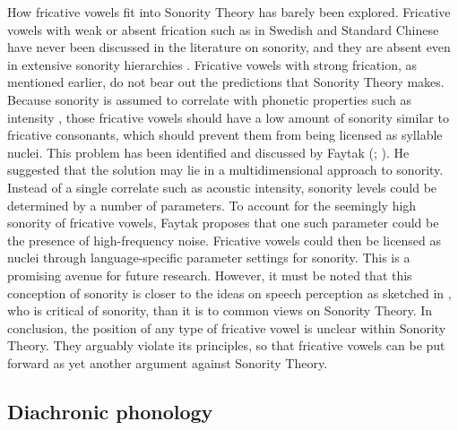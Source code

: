 \documentclass[output=paper,colorlinks,citecolor=brown,chinesefont]{langscibook}
\begin{document}
How fricative vowels fit into Sonority Theory has barely been explored. Fricative vowels with weak or absent frication such as in Swedish and Standard Chinese have never been discussed in the literature on sonority, and they are absent even in extensive sonority hierarchies \citep[60]{Parker_2008}. Fricative vowels with strong frication, as mentioned earlier, do not bear out the predictions that Sonority Theory makes. Because sonority is assumed to correlate with phonetic properties such as intensity \citep{Parker_2008}, those fricative vowels should have a low amount of sonority similar to fricative consonants, which should prevent them from being licensed as syllable nuclei. This problem has been identified and discussed by Faytak (\citeyear{Faytak_2014a}; \citeyear{Faytak_2017}). He suggested that the solution may lie in a multidimensional approach to sonority. Instead of a single correlate such as acoustic intensity, sonority levels could be determined by a number of parameters. To account for the seemingly high sonority of fricative vowels, Faytak proposes that one such parameter could be the presence of high-frequency noise. Fricative vowels could then be licensed as nuclei through language-specific parameter settings for sonority. This is a promising avenue for future research. However, it must be noted that this conception of sonority is closer to the ideas on speech perception as sketched in \citet{Harris_2006}, who is critical of sonority, than it is to common views on Sonority Theory. In conclusion, the position of any type of fricative vowel is unclear within Sonority Theory. They arguably violate its principles, so that fricative vowels can be put forward as yet another argument against Sonority Theory.

\subsection{Diachronic phonology} \label{histo}
\end{document}
